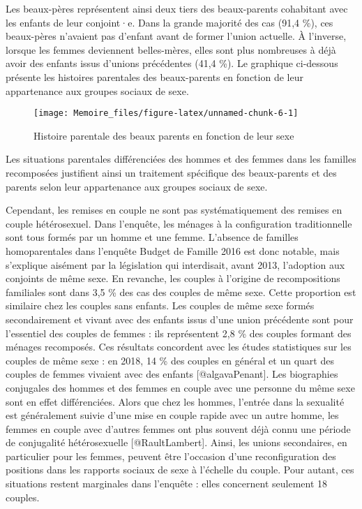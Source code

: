 \documentclass[
  12pt,
]{book}
\begin{document}
Les beaux-pères représentent ainsi deux tiers des beaux-parents
cohabitant avec les enfants de leur conjoint·e. Dans la grande majorité
des cas (91,4 \%), ces beaux-pères n'avaient pas d'enfant avant de
former l'union actuelle. À l'inverse, lorsque les femmes deviennent
belles-mères, elles sont plus nombreuses à déjà avoir des enfants issus
d'unions précédentes (41,4 \%). Le graphique ci-dessous présente les
histoires parentales des beaux-parents en fonction de leur appartenance
aux groupes sociaux de sexe.

\begin{figure}[h]

{\centering \texttt{[image: Memoire\_files/figure-latex/unnamed-chunk-6-1]} 

}

\caption{Histoire parentale des beaux parents en fonction de leur sexe}\label{fig:unnamed-chunk-6}
\end{figure}

Les situations parentales différenciées des hommes et des femmes dans
les familles recomposées justifient ainsi un traitement spécifique des
beaux-parents et des parents selon leur appartenance aux groupes sociaux
de sexe.

Cependant, les remises en couple ne sont pas systématiquement des
remises en couple hétérosexuel. Dans l'enquête, les ménages à la
configuration traditionnelle sont tous formés par un homme et une femme.
L'absence de familles homoparentales dans l'enquête Budget de Famille
2016 est donc notable, mais s'explique aisément par la législation qui
interdisait, avant 2013, l'adoption aux conjoints de même sexe. En
revanche, les couples à l'origine de recompositions familiales sont dans
3,5 \% des cas des couples de même sexe. Cette proportion est similaire
chez les couples sans enfants. Les couples de même sexe formés
secondairement et vivant avec des enfants issus d'une union précédente
sont pour l'essentiel des couples de femmes : ils représentent 2,8 \%
des couples formant des ménages recomposés. Ces résultats concordent
avec les études statistiques sur les couples de même sexe : en 2018, 14
\% des couples en général et un quart des couples de femmes vivaient
avec des enfants {[}@algavaPenant{]}. Les biographies conjugales des
hommes et des femmes en couple avec une personne du même sexe sont en
effet différenciées. Alors que chez les hommes, l'entrée dans la
sexualité est généralement suivie d'une mise en couple rapide avec un
autre homme, les femmes en couple avec d'autres femmes ont plus souvent
déjà connu une période de conjugalité hétérosexuelle
{[}@RaultLambert{]}. Ainsi, les unions secondaires, en particulier pour
les femmes, peuvent être l'occasion d'une reconfiguration des positions
dans les rapports sociaux de sexe à l'échelle du couple. Pour autant,
ces situations restent marginales dans l'enquête : elles concernent
seulement 18 couples.
\end{document}

